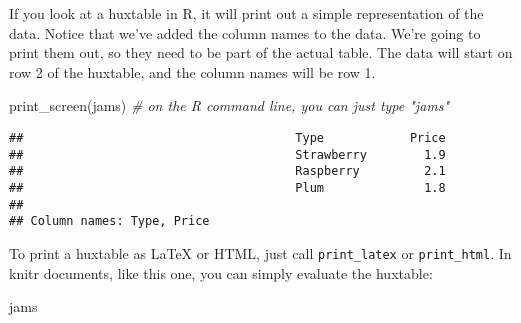 \documentclass[
]{article}
\newenvironment{Shaded}{\begin{snugshade}}{\end{snugshade}}
\newcommand{\CommentTok}[1]{\textcolor[rgb]{0.56,0.35,0.01}{\textit{#1}}}
\newcommand{\FunctionTok}[1]{\textcolor[rgb]{0.00,0.00,0.00}{#1}}
\newcommand{\NormalTok}[1]{#1}
\begin{document}
\FloatBarrier

If you look at a huxtable in R, it will print out a simple
representation of the data. Notice that we've added the column names to
the data. We're going to print them out, so they need to be part of the
actual table. The data will start on row 2 of the huxtable, and the
column names will be row 1.

\begin{Shaded}
\begin{Highlighting}[]
\FunctionTok{print\_screen}\NormalTok{(jams)     }\CommentTok{\# on the R command line, you can just type "jams"}
\end{Highlighting}
\end{Shaded}

\begin{verbatim}
##                                      Type            Price  
##                                      Strawberry        1.9  
##                                      Raspberry         2.1  
##                                      Plum              1.8  
## 
## Column names: Type, Price
\end{verbatim}

\FloatBarrier

To print a huxtable as LaTeX or HTML, just call \texttt{print\_latex} or
\texttt{print\_html}. In knitr documents, like this one, you can simply
evaluate the huxtable:

\begin{Shaded}
\begin{Highlighting}[]
\NormalTok{jams}
\end{Highlighting}
\end{Shaded}

 
  \providecommand{\huxb}[2]{\arrayrulecolor[RGB]{#1}\global\arrayrulewidth=#2pt}
  \providecommand{\huxvb}[2]{\color[RGB]{#1}\vrule width #2pt}
  \providecommand{\huxtpad}[1]{\rule{0pt}{#1}}
  \providecommand{\huxbpad}[1]{\rule[-#1]{0pt}{#1}}
\end{document}
